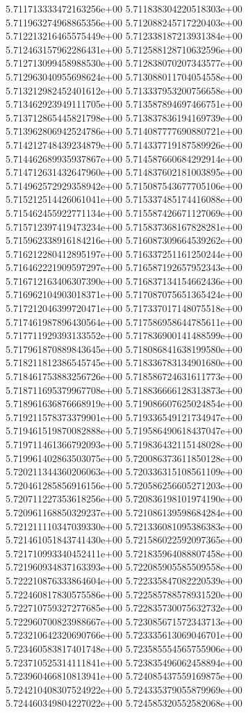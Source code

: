 5.711713333472163256e+00
5.711838304220518303e+00
5.711963274968865356e+00
5.712088245717220403e+00
5.712213216465575449e+00
5.712338187213931384e+00
5.712463157962286431e+00
5.712588128710632596e+00
5.712713099458988530e+00
5.712838070207343577e+00
5.712963040955698624e+00
5.713088011704054558e+00
5.713212982452401612e+00
5.713337953200756658e+00
5.713462923949111705e+00
5.713587894697466751e+00
5.713712865445821798e+00
5.713837836194169739e+00
5.713962806942524786e+00
5.714087777690880721e+00
5.714212748439234879e+00
5.714337719187589926e+00
5.714462689935937867e+00
5.714587660684292914e+00
5.714712631432647960e+00
5.714837602181003895e+00
5.714962572929358942e+00
5.715087543677705106e+00
5.715212514426061041e+00
5.715337485174416088e+00
5.715462455922771134e+00
5.715587426671127069e+00
5.715712397419473234e+00
5.715837368167828281e+00
5.715962338916184216e+00
5.716087309664539262e+00
5.716212280412895197e+00
5.716337251161250244e+00
5.716462221909597297e+00
5.716587192657952343e+00
5.716712163406307390e+00
5.716837134154662436e+00
5.716962104903018371e+00
5.717087075651365424e+00
5.717212046399720471e+00
5.717337017148075518e+00
5.717461987896430564e+00
5.717586958644785611e+00
5.717711929393133552e+00
5.717836900141488599e+00
5.717961870889843645e+00
5.718086841638199580e+00
5.718211812386545745e+00
5.718336783134901680e+00
5.718461753883256726e+00
5.718586724631611773e+00
5.718711695379967708e+00
5.718836666128313873e+00
5.718961636876668919e+00
5.719086607625024854e+00
5.719211578373379901e+00
5.719336549121734947e+00
5.719461519870082888e+00
5.719586490618437047e+00
5.719711461366792093e+00
5.719836432115148028e+00
5.719961402863503075e+00
5.720086373611850128e+00
5.720211344360206063e+00
5.720336315108561109e+00
5.720461285856916156e+00
5.720586256605271203e+00
5.720711227353618256e+00
5.720836198101974190e+00
5.720961168850329237e+00
5.721086139598684284e+00
5.721211110347039330e+00
5.721336081095386383e+00
5.721461051843741430e+00
5.721586022592097365e+00
5.721710993340452411e+00
5.721835964088807458e+00
5.721960934837163393e+00
5.722085905585509558e+00
5.722210876333864604e+00
5.722335847082220539e+00
5.722460817830575586e+00
5.722585788578931520e+00
5.722710759327277685e+00
5.722835730075632732e+00
5.722960700823988667e+00
5.723085671572343713e+00
5.723210642320690766e+00
5.723335613069046701e+00
5.723460583817401748e+00
5.723585554565755906e+00
5.723710525314111841e+00
5.723835496062458894e+00
5.723960466810813941e+00
5.724085437559169875e+00
5.724210408307524922e+00
5.724335379055879969e+00
5.724460349804227022e+00
5.724585320552582068e+00
